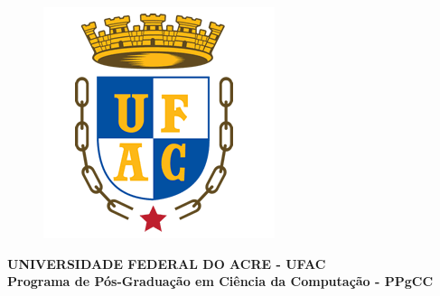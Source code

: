 \documentclass[
	12pt,				%
	openright,			%
	oneside,			%
	a4paper,			%
	english,			%
	french,				%
	spanish,			%
	brazil				%
	]{abntex2}
\begin{document}

\frenchspacing 


\begin{figure}
	\centering
	\includegraphics[width=.15\textwidth]{imagens/brasao_UFAC.png}	
	\label{fig:UFAC}
\end{figure}
\begin{center}
	\textbf{UNIVERSIDADE FEDERAL DO ACRE - UFAC \\
	Programa de Pós-Graduação em Ciência da Computação - PPgCC}
\end{center}
\vspace{3cm}
\imprimircapa

\imprimirfolhaderosto

%
%     
\end{document}
